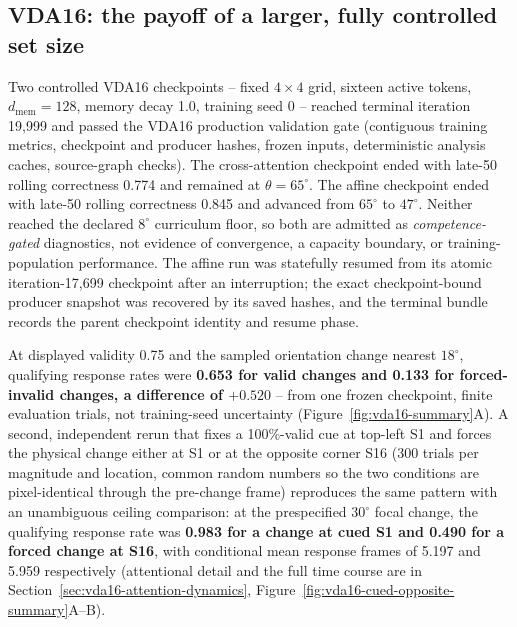 \documentclass[11pt,a4paper]{article}
\begin{document}
\subsection{VDA16: the payoff of a larger, fully controlled set size}\label{sec:vda16-behavior}
Two controlled VDA16 checkpoints -- fixed $4\times4$ grid, sixteen active tokens, $d_\mathrm{mem}=128$, memory decay 1.0, training seed 0 -- reached terminal iteration 19{,}999 and passed the VDA16 production validation gate (contiguous training metrics, checkpoint and producer hashes, frozen inputs, deterministic analysis caches, source-graph checks). The cross-attention checkpoint ended with late-50 rolling correctness 0.774 and remained at $\theta=65^\circ$. The affine checkpoint ended with late-50 rolling correctness 0.845 and advanced from $65^\circ$ to $47^\circ$. Neither reached the declared $8^\circ$ curriculum floor, so both are admitted as \emph{competence-gated} diagnostics, not evidence of convergence, a capacity boundary, or training-population performance. The affine run was statefully resumed from its atomic iteration-17{,}699 checkpoint after an interruption; the exact checkpoint-bound producer snapshot was recovered by its saved hashes, and the terminal bundle records the parent checkpoint identity and resume phase.

At displayed validity 0.75 and the sampled orientation change nearest $18^\circ$, qualifying response rates were \textbf{0.653 for valid changes and 0.133 for forced-invalid changes, a difference of $+0.520$} -- from one frozen checkpoint, finite evaluation trials, not training-seed uncertainty (Figure~\ref{fig:vda16-summary}A). A second, independent rerun that fixes a 100\%-valid cue at top-left S1 and forces the physical change either at S1 or at the opposite corner S16 (300 trials per magnitude and location, common random numbers so the two conditions are pixel-identical through the pre-change frame) reproduces the same pattern with an unambiguous ceiling comparison: at the prespecified $30^\circ$ focal change, the qualifying response rate was \textbf{0.983 for a change at cued S1 and 0.490 for a forced change at S16}, with conditional mean response frames of 5.197 and 5.959 respectively (attentional detail and the full time course are in Section~\ref{sec:vda16-attention-dynamics}, Figure~\ref{fig:vda16-cued-opposite-summary}A--B).
\end{document}
